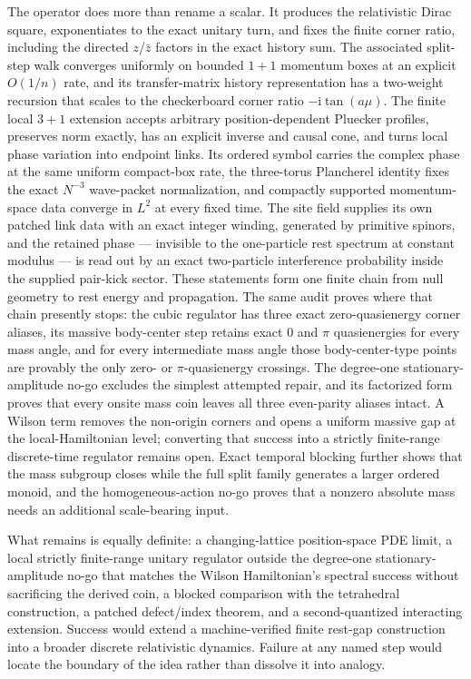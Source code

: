 \documentclass[11pt]{article}
\newcommand{\ii}{\mathrm{i}}
\begin{document}
The operator does more than rename a scalar.  It produces the relativistic
Dirac square, exponentiates to the exact unitary turn, and fixes the finite
corner ratio, including the directed $z$/$\bar z$ factors in the exact history
sum.  The associated split-step walk converges uniformly on bounded
$1+1$ momentum boxes at an explicit $O(1/n)$ rate, and its transfer-matrix
history representation has a two-weight recursion that scales to the
checkerboard corner ratio $-\ii\tan(a\mu)$.  The
   finite local $3+1$ extension accepts arbitrary position-dependent
   Pluecker profiles, preserves norm exactly, has an explicit inverse and
   causal cone, and turns local phase variation into endpoint links.  Its
   ordered symbol carries the complex phase at the same uniform compact-box
   rate, the three-torus Plancherel identity fixes the exact $N^{-3}$
   wave-packet normalization, and compactly supported momentum-space data
   converge in $L^2$ at every fixed time.  The site field supplies its own
   patched link data with an exact integer winding, generated by primitive
   spinors, and the retained phase --- invisible to the one-particle rest
   spectrum at constant modulus --- is read out by an exact two-particle interference
   probability inside the supplied pair-kick sector.  These statements form
   one finite
   chain from null geometry to rest energy and propagation.  The same audit proves where that chain
   presently stops: the cubic regulator has three exact zero-quasienergy corner
   aliases, its massive body-center step retains exact $0$ and $\pi$
   quasienergies for every mass angle, and for every intermediate mass angle
   those body-center-type points are provably the only zero- or
   $\pi$-quasienergy crossings.  The degree-one stationary-amplitude
   no-go excludes the simplest attempted repair, and its factorized form proves
   that every onsite mass coin leaves all three even-parity aliases intact.
   A Wilson term removes the
   non-origin corners and opens a uniform massive gap at the local-Hamiltonian
   level; converting that success into a strictly finite-range discrete-time
   regulator remains open.  Exact temporal blocking further shows that the
   mass subgroup closes while the full split family generates a larger ordered
   monoid, and the homogeneous-action no-go proves that a nonzero absolute
   mass needs an additional scale-bearing input.

What remains is equally definite: a changing-lattice position-space PDE limit, a local
 strictly finite-range unitary regulator outside the degree-one
 stationary-amplitude no-go that matches the Wilson Hamiltonian's spectral
 success without sacrificing the derived coin, a blocked
 comparison with the tetrahedral construction, a patched defect/index theorem,
 and a second-quantized interacting extension.  Success would extend a machine-verified finite
rest-gap construction into a broader discrete relativistic dynamics.  Failure
at any named step would locate the boundary of the idea rather than dissolve
it into analogy.
\end{document}
